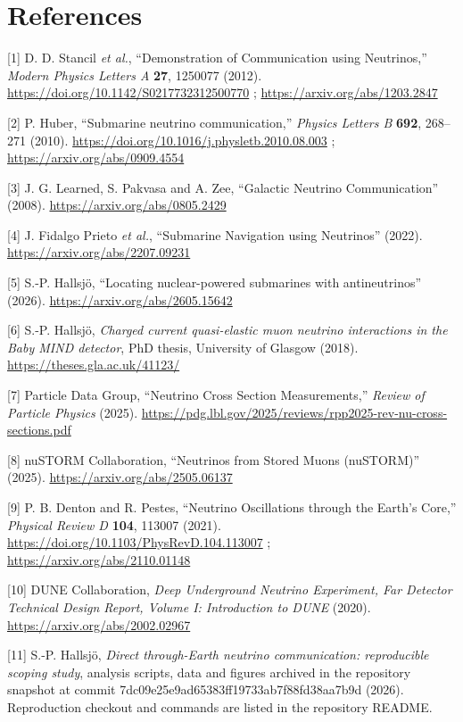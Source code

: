 \documentclass[
]{article}
\begin{document}
\hypertarget{references}{%
\section{References}\label{references}}

{[}1{]} D. D. Stancil \emph{et al.}, ``Demonstration of Communication
using Neutrinos,'' \emph{Modern Physics Letters A} \textbf{27}, 1250077
(2012). \url{https://doi.org/10.1142/S0217732312500770} ;
\url{https://arxiv.org/abs/1203.2847}

{[}2{]} P. Huber, ``Submarine neutrino communication,'' \emph{Physics
Letters B} \textbf{692}, 268--271 (2010).
\url{https://doi.org/10.1016/j.physletb.2010.08.003} ;
\url{https://arxiv.org/abs/0909.4554}

{[}3{]} J. G. Learned, S. Pakvasa and A. Zee, ``Galactic Neutrino
Communication'' (2008). \url{https://arxiv.org/abs/0805.2429}

{[}4{]} J. Fidalgo Prieto \emph{et al.}, ``Submarine Navigation using
Neutrinos'' (2022). \url{https://arxiv.org/abs/2207.09231}

{[}5{]} S.-P. Hallsjö, ``Locating nuclear-powered submarines with
antineutrinos'' (2026). \url{https://arxiv.org/abs/2605.15642}

{[}6{]} S.-P. Hallsjö, \emph{Charged current quasi-elastic muon neutrino
interactions in the Baby MIND detector}, PhD thesis, University of
Glasgow (2018). \url{https://theses.gla.ac.uk/41123/}

{[}7{]} Particle Data Group, ``Neutrino Cross Section Measurements,''
\emph{Review of Particle Physics} (2025).
\url{https://pdg.lbl.gov/2025/reviews/rpp2025-rev-nu-cross-sections.pdf}

{[}8{]} nuSTORM Collaboration, ``Neutrinos from Stored Muons (nuSTORM)''
(2025). \url{https://arxiv.org/abs/2505.06137}

{[}9{]} P. B. Denton and R. Pestes, ``Neutrino Oscillations through the
Earth's Core,'' \emph{Physical Review D} \textbf{104}, 113007 (2021).
\url{https://doi.org/10.1103/PhysRevD.104.113007} ;
\url{https://arxiv.org/abs/2110.01148}

{[}10{]} DUNE Collaboration, \emph{Deep Underground Neutrino Experiment,
Far Detector Technical Design Report, Volume I: Introduction to DUNE}
(2020). \url{https://arxiv.org/abs/2002.02967}

{[}11{]} S.-P. Hallsjö, \emph{Direct through-Earth neutrino
communication: reproducible scoping study}, analysis scripts, data and
figures archived in the repository snapshot at commit
7dc09e25e9ad65383ff19733ab7f88fd38aa7b9d (2026). Reproduction checkout
and commands are listed in the repository README.
\end{document}
